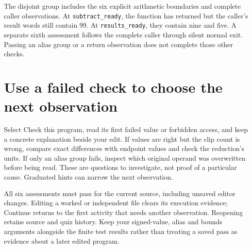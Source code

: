 The disjoint group includes the six explicit arithmetic boundaries and complete
caller observations. At \texttt{subtract\_ready}, the function has returned but
the caller's result words still contain 99. At \texttt{results\_ready}, they
contain nine and five. A separate sixth assessment follows the complete caller
through silent normal exit. Passing an alias group or a return observation does
not complete those other checks.

\section{Use a failed check to choose the next observation}

Select Check this program, read its first failed value or forbidden access, and
keep a concrete explanation beside your edit. If values are right but the clip
count is wrong, compare exact differences with endpoint values and check the
reduction's units. If only an alias group fails, inspect which original operand
was overwritten before being read. These are questions to investigate, not
proof of a particular cause. Graduated hints can narrow the next observation.

All six assessments must pass for the current source, including unsaved editor
changes. Editing a worked or independent file clears its execution evidence;
Continue returns to the first activity that needs another observation. Reopening
retains source and quiz history. Keep your signed-value, alias and bounds
arguments alongside the finite test results rather than treating a saved pass
as evidence about a later edited program.
